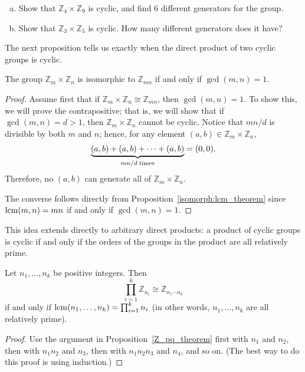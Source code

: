 \begin{exercise}{}
\begin{enumerate}[(a)]
\item
Show that $\mathbb{Z}_4 \times \mathbb{Z}_9$ is cyclic, and find 6 different generators for the group. 
\item
Show that $\mathbb{Z}_3 \times \mathbb{Z}_5$ is cyclic. How many different generators does it have?
\end{enumerate} 
\end{exercise}
 
The next proposition tells us exactly when the direct product of two
cyclic groups is cyclic. 
 

\begin{thm}\label{Z_pq_theorem}
The group ${\mathbb Z}_m \times {\mathbb Z}_n$ is isomorphic to ${\mathbb
Z}_{mn}$ if and only if $\gcd(m,n)=1$. 
\end{thm}
 

\begin{proof}
Assume first that if ${\mathbb Z}_m \times {\mathbb Z}_n \cong {\mathbb
Z}_{mn}$, then $\gcd(m, n) = 1$. To show this, we will prove the
contrapositive; that is, we will show that if $\gcd(m, n) = d >
1$, then ${\mathbb Z}_m \times {\mathbb Z}_n$ cannot be cyclic. Notice that
$mn/d$ is divisible by both $m$ and $n$; hence, for any element $(a,b)
\in {\mathbb Z}_m \times {\mathbb Z}_n$,  
\[
\underbrace{(a,b) + (a,b)+ \cdots + (a,b)}_{mn/d \; {\rm
times}}
= (0, 0).
\]
Therefore, no $(a, b)$ can generate all of ${\mathbb Z}_m \times {\mathbb
Z}_n$. 

 
The converse follows directly from Proposition~\ref{isomorph:lcm_theorem} since
$\operatorname{lcm}(m,n) = mn$ if and only if $\gcd(m,n)=1$. 
\end{proof}
\medskip 

This idea extends directly to arbitrary direct products: a product of cyclic groups is cyclic if and only if the 
orders of the groups in the product are all relatively prime.

\begin{thm}\label{RelativelyPrime}
Let $n_1, \ldots, n_k$ be positive integers. Then
\[
\prod_{i=1}^k {\mathbb Z}_{n_i} \cong {\mathbb Z}_{n_1 \cdots n_k}
\]
if and only if $\operatorname{lcm}( n_1, \ldots, n_k) =\prod_{i=1}^k n_i$ (in other words, $n_1, \ldots, n_k$ are all relatively prime).
\end{thm}

\begin{proof}
Use the argument in Proposition~\ref{Z_pq_theorem} first with $n_1$ and $n_2$, then with $n_1n_2$ and $n_3$,
then with $n_1n_2n_3$ and $n_4$, and so on. (The best way to do this proof is using induction.)
\end{proof}


